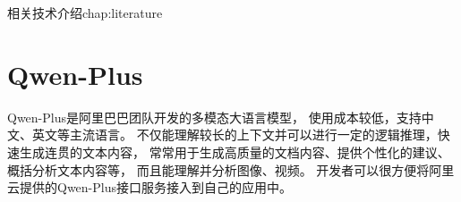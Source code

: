 \begin{cuzchapter}{相关技术介绍}{chap:literature}





	\section{Qwen-Plus}
	Qwen-Plus是阿里巴巴团队开发的多模态大语言模型，
	使用成本较低，支持中文、英文等主流语言。
	不仅能理解较长的上下文并可以进行一定的逻辑推理，快速生成连贯的文本内容，
	常常用于生成高质量的文档内容、提供个性化的建议、概括分析文本内容等，
	而且能理解并分析图像、视频。
	开发者可以很方便将阿里云提供的Qwen-Plus接口服务接入到自己的应用中。





\end{cuzchapter}

